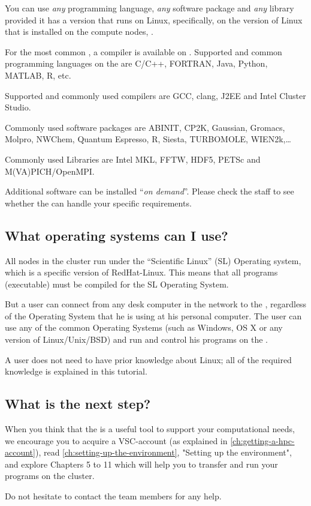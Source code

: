 You can use \emph{any} programming language, \emph{any} software package and
\emph{any} library provided it has a version that runs on Linux, specifically,
on the version of Linux that is installed on the compute nodes, \operatingsystem.

For the most common , a compiler is available on
\operatingsystem. Supported and common programming languages on the \hpc are
C/C++, FORTRAN, Java, Python, MATLAB, R, etc.

Supported and commonly used compilers are GCC, clang, J2EE and Intel Cluster
Studio.

Commonly used software packages are ABINIT, CP2K, Gaussian, Gromacs, Molpro,
NWChem, Quantum Espresso, R, Siesta, TURBOMOLE, WIEN2k,\ldots

Commonly used Libraries are Intel MKL, FFTW, HDF5, PETSc and M(VA)PICH/OpenMPI.

Additional software can be installed ``\emph{on demand}''. Please check the
\hpc staff to see whether the \hpc can handle your specific requirements.

\subsection{What operating systems can I use?}
\label{sec:what-operating-systems-can-i-use}

All nodes in the \hpc cluster run under the ``Scientific Linux'' (SL)
Operating system, which is a specific version of RedHat-Linux. This means that
all programs (executable) must be compiled for the SL Operating System.

But a user can connect from any desk computer in the \university network to the \hpc,
regardless of the Operating System that he is using at his personal computer.
The user can use any of the common Operating Systems (such as Windows, OS X or
any version of Linux/Unix/BSD) and run and control his programs on the \hpc.

A user does not need to have prior knowledge about Linux; all of the required
knowledge is explained in this tutorial.

\subsection{What is the next step?}
\label{sec:what-is-the-next-step}

When you think that the \hpc is a useful tool to support your computational
needs, we encourage you to acquire a VSC-account (as explained in
\autoref{ch:getting-a-hpc-account}), read \autoref{ch:setting-up-the-environment}, "Setting up the
environment", and explore Chapters 5 to 11 which will help you to transfer and
run your programs on the \hpc cluster.

Do not hesitate to contact the \hpc team members for any help.

